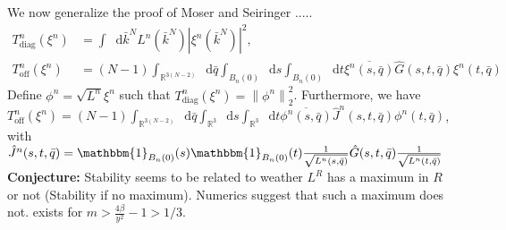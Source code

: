 \documentclass[a4paper,11pt]{article}
\newcommand{\norm}[1]{\left\lVert #1 \right\rVert}
\newcommand{\abs}[1]{\left\lvert #1 \right\rvert}
\newcommand*\diff{\mathop{}\!\mathrm{d}}
\newcommand{\R}{\mathbb{R}}
\numberwithin{equation}{section}
\begin{document}
We now generalize the proof of Moser and Seiringer \cite{Moser_2017}.....\\
\begin{equation}
\begin{aligned}
T^n_{\text{diag}}(\xi^n)&=\int\diff\bar{k}^N L^n(\bar{k}^N)\abs{\xi^n(\bar{k}^N)}^2,\\ T^n_{\text{off}}(\xi^n)&=(N-1)\int_{\R^{3(N-2)}}\diff \bar{q}\int_{B_n(0)}\diff s\int_{B_n(0)}\diff t\overline{\xi^n(s,\bar{q})}\hat{G}(s,t,\bar{q})\xi^n(t,\bar{q})
\end{aligned}
\end{equation}
Define $ \phi^n=\sqrt{L^n}\xi^n $ such that $ T^n_{\text{diag}}(\xi^n)=\norm{\phi^n}_2^2 $. Furthermore, we have\\ $ T^n_{\text{off}}(\xi^n)=(N-1)\int_{\R^{3(N-2)}}\diff \bar{q}\int_{\R^3}\diff s\int_{\R^3}\diff t\overline{\phi^n(s,\bar{q})}\hat{J}^n(s,t,\bar{q})\phi^n(t,\bar{q}) $, with\\ $ \hat{J}^n(s,t,\bar{q})=\mathbbm{1}_{B_n(0)}(s)\mathbbm{1}_{B_n(0)}(t)\frac{1}{\sqrt{L^n(s,\bar{q})}}\hat{G}(s,t,\bar{q})\frac{1}{\sqrt{L^n(t,\bar{q})}} $\\
\textbf{Conjecture:} Stability seems to be related to weather $ L^R $ has a maximum in $ R $ or not (Stability if no maximum). Numerics suggest that such a maximum does not. exists for $ m>\frac{4\beta}{y^2}-1>1/3 $.

\appendix
\end{document}
